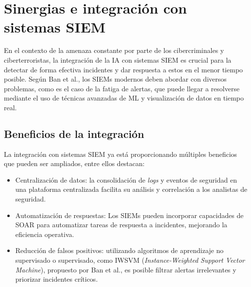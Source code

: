

\section{Sinergias e integración con sistemas \gls{SIEM}}

En el contexto de la amenaza constante por parte de los cibercriminales y ciberterroristas, la integración de la \gls{IA} con sistemas \gls{SIEM} es crucial para la detectar de forma efectiva incidentes y dar respuesta a estos en el menor tiempo posible. Según Ban et al.\cite{bantao2023}, los \gls{SIEM}s modernos deben abordar con diversos problemas, como es el caso de la fatiga de alertas, que puede llegar a resolverse mediante el uso de técnicas avanzadas de \gls{ML} y visualización de datos en tiempo real.

\vspace{-2mm}

\subsection{Beneficios de la integración}

La integración con sistemas \gls{SIEM} ya está proporcionando múltiples beneficios que pueden ser ampliados, entre ellos destacan:

\begin{itemize}
    \item Centralización de datos: la consolidación de \textit{logs} y eventos de seguridad en una plataforma centralizada facilita su análisis y correlación a los analistas de seguridad.

    \item Automatización de respuestas: Los \gls{SIEM}s pueden incorporar capacidades de \gls{SOAR} para automatizar tareas de respuesta a incidentes, mejorando la eficiencia operativa. 
    
    \item Reducción de falsos positivos: utilizando algoritmos de aprendizaje no supervisado o supervisado, como \gls{IWSVM} (\textit{Instance-Weighted Support Vector Machine}), propuesto por Ban et al.\cite{bantao2023}\footnotemark, es posible filtrar alertas irrelevantes y priorizar incidentes críticos.  
\end{itemize}

